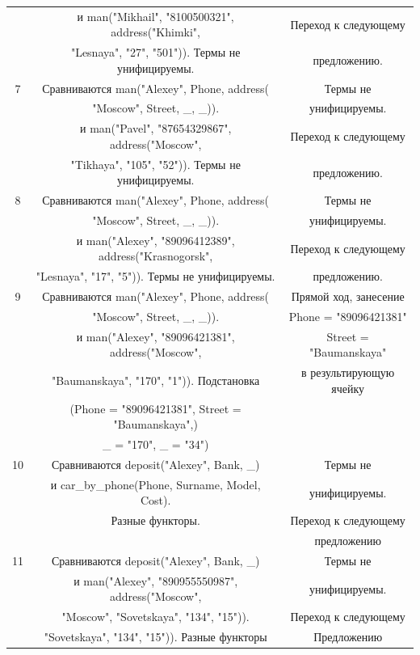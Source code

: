 \documentclass[12pt]{report}
\begin{document}
\begin{table}[H]
\begin{center}
\begin{tabular}{|c c c |}
			  & и man("Mikhail"{}, "8100500321"{}, address("Khimki"{}, & Переход к следующему \\
			  & "Lesnaya"{}, "27"{}, "501"{})). Термы не унифицируемы. & предложению. \\
			\hline
			7 & Сравниваются man("Alexey"{}, Phone, address( & Термы не \\
			  & "Moscow"{}, Street, \_, \_)). & унифицируемы. \\
			  & и man("Pavel"{}, "87654329867"{}, address("Moscow"{}, & Переход к следующему \\
			  & "Tikhaya"{}, "105"{}, "52"{})). Термы не унифицируемы. & предложению. \\
			\hline
			8 & Сравниваются man("Alexey"{}, Phone, address( & Термы не \\
			  & "Moscow"{}, Street, \_, \_)). & унифицируемы. \\
			  & и man("Alexey"{}, "89096412389"{}, address("Krasnogorsk"{}, & Переход к следующему \\
			  & "Lesnaya"{}, "17"{}, "5"{})). Термы не унифицируемы. & предложению. \\
			\hline
			9 & Сравниваются man("Alexey"{}, Phone, address( & Прямой ход, занесение\\
			  & "Moscow"{}, Street, \_, \_)). & Phone = "89096421381"{} \\
			  & и man("Alexey"{}, "89096421381"{}, address("Moscow"{}, & Street = "Baumanskaya"{} \\
			  & "Baumanskaya"{}, "170"{}, "1"{})). Подстановка & в результирующую ячейку \\
			  & (Phone = "89096421381"{}, Street = "Baumanskaya"{},)& \\
			  &  \_ = "170"{}, \_ = "34"{}) & \\
			\hline
			10 & Сравниваются deposit("Alexey"{}, Bank, \_) & Термы не \\
			& и car\_by\_phone(Phone, Surname, Model, Cost). & унифицируемы. \\
			& Разные функторы. &Переход к следующему \\
			& & предложению\\
			\hline
			11 & Сравниваются deposit("Alexey"{}, Bank, \_) & Термы не \\
			& и man("Alexey"{}, "890955550987"{}, address("Moscow"{}, & унифицируемы. \\
			& "Moscow"{}, "Sovetskaya"{}, "134"{}, "15"{})).  & Переход к следующему \\
			& "Sovetskaya"{}, "134"{}, "15"{})). Разные функторы & Предложению \\
			\hline
		\end{tabular}
	\end{center}
\end{table}
\end{document}
